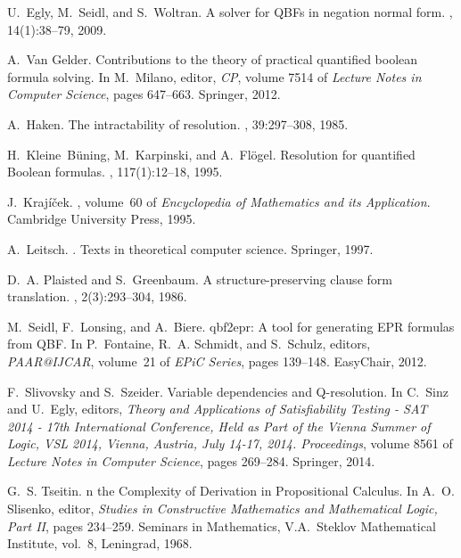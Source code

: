\documentclass{llncs}
\begin{document}
\begin{thebibliography}{10}
U.~Egly, M.~Seidl, and S.~Woltran.
\newblock A solver for {QBF}s in negation normal form.
, 14(1):38--79, 2009.

A.~Van Gelder.
\newblock Contributions to the theory of practical quantified boolean formula
  solving.
\newblock In M.~Milano, editor, {\em CP}, volume 7514 of {\em Lecture Notes in
  Computer Science}, pages 647--663. Springer, 2012.

A.~Haken.
\newblock The intractability of resolution.
, 39:297--308, 1985.

H.~Kleine~B{\"u}ning, M.~Karpinski, and A.~Fl{\"o}gel.
\newblock Resolution for quantified {B}oolean formulas.
, 117(1):12--18, 1995.

J.~Kraj\'{i}\v{c}ek.
,
  volume~60 of {\em Encyclopedia of Mathematics and its Application}.
\newblock Cambridge University Press, 1995.

A.~Leitsch.
.
\newblock Texts in theoretical computer science. Springer, 1997.

D.~A. Plaisted and S.~Greenbaum.
\newblock A structure-preserving clause form translation.
, 2(3):293--304, 1986.

M.~Seidl, F.~Lonsing, and A.~Biere.
\newblock qbf2epr: A tool for generating {EPR} formulas from {QBF}.
\newblock In P.~Fontaine, R.~A. Schmidt, and S.~Schulz, editors, {\em
  PAAR@IJCAR}, volume~21 of {\em EPiC Series}, pages 139--148. EasyChair, 2012.

F.~Slivovsky and S.~Szeider.
\newblock Variable dependencies and {Q}-resolution.
\newblock In C.~Sinz and U.~Egly, editors, {\em Theory and Applications of
  Satisfiability Testing - {SAT} 2014 - 17th International Conference, Held as
  Part of the Vienna Summer of Logic, {VSL} 2014, Vienna, Austria, July 14-17,
  2014. Proceedings}, volume 8561 of {\em Lecture Notes in Computer Science},
  pages 269--284. Springer, 2014.

G.~S. Tseitin.
n the {C}omplexity of {D}erivation in {P}ropositional {C}alculus.
\newblock In A.~O. Slisenko, editor, {\em Studies in Constructive Mathematics
  and Mathematical Logic, Part II}, pages 234--259. Seminars in Mathematics,
  V.A.\ Steklov Mathematical Institute, vol.\ 8, Leningrad, 1968.


\end{thebibliography}
\end{document}
